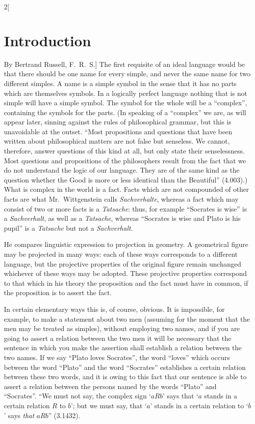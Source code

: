 \documentclass[oneside,openany,12pt]{book}
\begin{document}
\begin{multicols}{2}[\section*{Introduction}By Bertrand Russell, F.\ R.\ S.]
The first requisite of an ideal language would be that there should be one name for every simple, and never the same name for two different simples. A name is a simple symbol in the sense that it has no parts which are themselves symbols. In a logically perfect language nothing that is not simple will have a simple symbol. The symbol for the whole will be a ``complex'', containing the symbols for the parts. (In speaking of a ``complex'' we are, as will appear later, sinning against the rules of philosophical grammar, but this is unavoidable at the outset. ``Most propositions and questions that have been written about philosophical matters are not false but senseless. We cannot, therefore, answer questions of this kind at all, but only state their senselessness. Most questions and propositions of the philosophers result from the fact that we do not understand the logic of our language. They are of the same kind as the question whether the Good is more or less identical than the Beautiful'' (4.003).) What is complex in the world is a fact. Facts which are not compounded of other facts are what Mr.\ Wittgenstein calls \emph{Sachverhalte}, whereas a fact which may consist of two or more facts is a \emph{Tatsache}: thus, for example ``Socrates is wise'' is a \emph{Sachverhalt}, as well as a \emph{Tatsache}, whereas ``Socrates is wise and Plato is his pupil'' is a \emph{Tatsache} but not a \emph{Sachverhalt}.

He compares linguistic expression to projection in geometry. A geometrical figure may be projected in many ways: each of these ways corresponds to a different language, but the projective properties of the original figure remain unchanged whichever of these ways may be adopted. These projective properties correspond to that which in his theory the proposition and the fact must have in common, if the proposition is to assert the fact.

In certain elementary ways this is, of course, obvious. It is impossible, for example, to make a statement about two men (assuming for the moment that the men may be treated as simples), without employing two names, and if you are going to assert a relation between the two men it will be necessary that the sentence in which you make the assertion shall establish a relation between the two names. If we say ``Plato loves Socrates'', the word ``loves'' which occurs between the word ``Plato'' and the word ``Socrates'' establishes a certain relation between these two words, and it is owing to this fact that our sentence is able to assert a relation between the persons named by the words ``Plato'' and ``Socrates''. ``We must not say, the complex sign `$aRb$' says that `$a$ stands in a certain relation $R$ to $b$'; but we must say, that `$a$' stands in a certain relation to `$b$' says \emph{that} $aRb$'' (3.1432).


\end{multicols}
\end{document}
